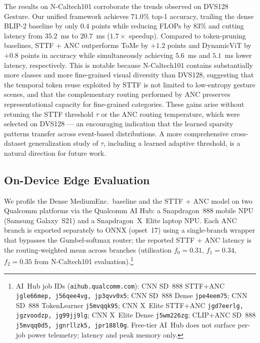 \documentclass{article}
\begin{document}
The results on N-Caltech101 corroborate the trends observed on DVS128 Gesture. Our unified framework achieves $71.0\%$ top-1 accuracy, trailing the dense BLIP-2 baseline by only $0.4$ points while reducing FLOPs by $83\%$ and cutting latency from $35.2$~ms to $20.7$~ms ($1.7\times$ speedup). Compared to token-pruning baselines, STTF + ANC outperforms ToMe by $+1.2$ points and DynamicViT by $+0.8$ points in accuracy while simultaneously achieving $5.6$~ms and $5.1$~ms lower latency, respectively. This is notable because N-Caltech101 contains substantially more classes and more fine-grained visual diversity than DVS128, suggesting that the temporal token reuse exploited by STTF is not limited to low-entropy gesture scenes, and that the complementary routing performed by ANC preserves representational capacity for fine-grained categories. These gains arise without retuning the STTF threshold $\tau$ or the ANC routing temperature, which were selected on DVS128 --- an encouraging indication that the learned sparsity patterns transfer across event-based distributions. A more comprehensive cross-dataset generalization study of $\tau$, including a learned adaptive threshold, is a natural direction for future work.

\subsection{On-Device Edge Evaluation}

We profile the Dense MediumEnc.\ baseline and the STTF + ANC model on two Qualcomm platforms via the Qualcomm AI Hub: a Snapdragon~888 mobile NPU (Samsung Galaxy~S21) and a Snapdragon~X~Elite laptop NPU. Each ANC branch is exported separately to ONNX (opset~17) using a single-branch wrapper that bypasses the Gumbel-softmax router; the reported STTF + ANC latency is the routing-weighted mean across branches (utilisation $f_0\!=\!0.31$, $f_1\!=\!0.34$, $f_2\!=\!0.35$ from N-Caltech101 evaluation).\footnote{AI~Hub job IDs (\texttt{aihub.qualcomm.com}): CNN SD~888 STTF+ANC \texttt{jgle66mep, j56qee4vg, jp3qvv0x5}; CNN SD~888 Dense \texttt{jpe4eem75}; CNN SD~888 TokenLearner \texttt{j5mvqqk95}; CNN X~Elite STTF+ANC \texttt{jgd7eerlg, jgzvoodzp, jg99jj9lg}; CNN X~Elite Dense \texttt{j5wm226zg}; CLIP+ANC SD~888 \texttt{j5mvqq0d5, jgnrllzk5, jpr188l0g}. Free-tier AI~Hub does not surface per-job power telemetry; latency and peak memory only.}
\end{document}

